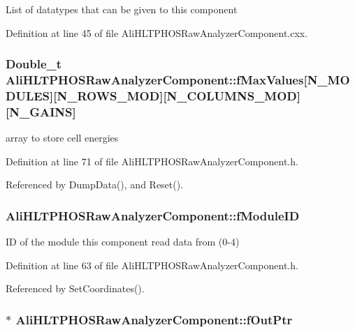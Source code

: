 List of datatypes that can be given to this component 

Definition at line 45 of file Ali\-HLTPHOSRaw\-Analyzer\-Component.cxx.
\subsubsection{\setlength{\rightskip}{0pt plus 5cm}Double\_\-t {\bf Ali\-HLTPHOSRaw\-Analyzer\-Component::f\-Max\-Values}[N\_\-MODULES][N\_\-ROWS\_\-MOD][N\_\-COLUMNS\_\-MOD][N\_\-GAINS]\hspace{0.3cm}{\tt  [private]}}\label{classAliHLTPHOSRawAnalyzerComponent_r9}


array to store cell energies 

Definition at line 71 of file Ali\-HLTPHOSRaw\-Analyzer\-Component.h.

Referenced by Dump\-Data(), and Reset().
\subsubsection{ {\bf Ali\-HLTPHOSRaw\-Analyzer\-Component::f\-Module\-ID}\hspace{0.3cm}{\tt  [private]}}\label{classAliHLTPHOSRawAnalyzerComponent_r1}


ID of the module this component read data from (0-4) 

Definition at line 63 of file Ali\-HLTPHOSRaw\-Analyzer\-Component.h.

Referenced by Set\-Coordinates().
\subsubsection{$\ast$ {\bf Ali\-HLTPHOSRaw\-Analyzer\-Component::f\-Out\-Ptr}\hspace{0.3cm}{\tt  [private]}}\label{classAliHLTPHOSRawAnalyzerComponent_r13}


